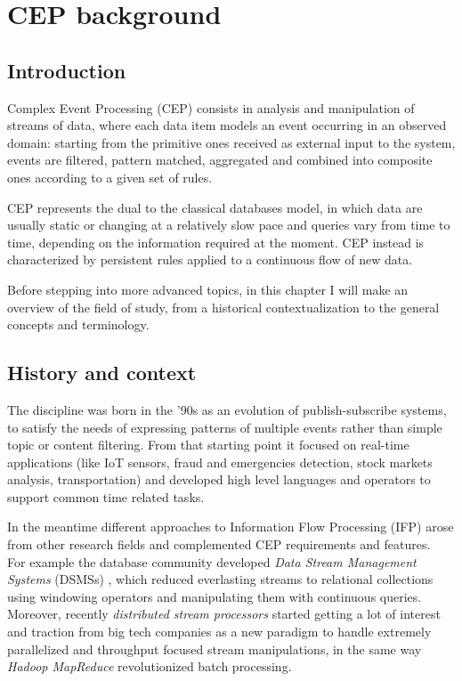 \chapter{CEP background}
\label{chap:cep-background}

\section{Introduction}
Complex Event Processing (CEP) \cite{cep-book} consists in analysis and manipulation of streams of data, where each data item models an event occurring in an observed domain: starting from the primitive ones received as external input to the system, events are filtered, pattern matched, aggregated and combined into composite ones according to a given set of rules.

CEP represents the dual to the classical databases model, in which data are usually static or changing at a relatively slow pace and queries vary from time to time, depending on the information required at the moment. CEP instead is characterized by persistent rules applied to a continuous flow of new data.

Before stepping into more advanced topics, in this chapter I will make an overview of the field of study, from a historical contextualization to the general concepts and terminology.

\section{History and context}
The discipline was born in the '90s as an evolution of publish-subscribe systems, to satisfy the needs of expressing patterns of multiple events rather than simple topic or content filtering. From that starting point it focused on real-time applications (like IoT sensors, fraud and emergencies detection, stock markets analysis, transportation) and developed high level languages and operators to support common time related tasks.


In the meantime different approaches to Information Flow Processing (IFP) \cite{ifp-survey} arose from other research fields and complemented CEP requirements and features.\\
For example the database community developed \emph{Data Stream Management Systems} (DSMSs) \cite{dsms}, which reduced everlasting streams to relational collections using windowing operators and manipulating them with continuous queries.\\
Moreover, recently \emph{distributed stream processors} started getting a lot of interest and traction from big tech companies as a new paradigm to handle extremely parallelized and throughput focused stream manipulations, in the same way \emph{Hadoop MapReduce} \cite{map-reduce} revolutionized batch processing.

